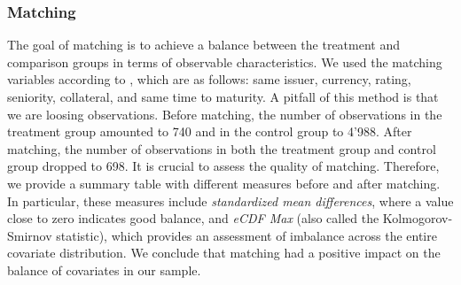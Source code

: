 \subsubsection*{Matching}
The goal of matching is to achieve a balance between the treatment and comparison groups in terms of observable characteristics. We used the matching variables according to \citet{zerbib2017green}, which are as follows: same issuer, currency, rating, seniority, collateral, and same time to maturity. A pitfall of this method is that we are loosing observations. Before matching, the number of observations in the treatment group amounted to 740 and in the control group to 4'988. After matching, the number of observations in both the treatment group and control group dropped to 698. It is crucial to assess the quality of matching. Therefore, we provide a summary table with different measures before and after matching. In particular, these measures include \textit{standardized mean differences}, where a value close to zero indicates good balance, and \textit{eCDF Max} (also called the Kolmogorov-Smirnov statistic), which provides an assessment of imbalance across the entire covariate distribution. We conclude that matching had a positive impact on the balance of covariates in our sample.

